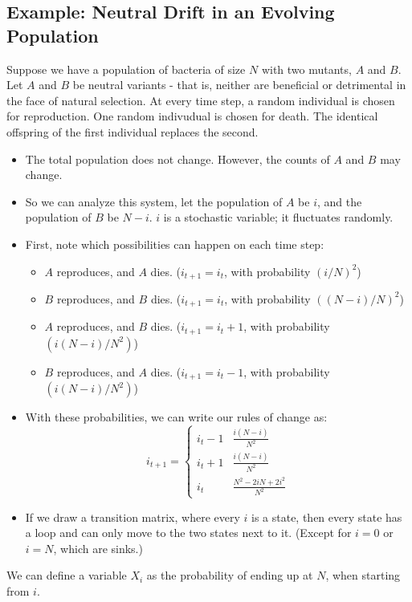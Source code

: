\documentclass[10pt]{article}
\begin{document}
\subsection*{Example: Neutral Drift in an Evolving Population}
Suppose we have a population of bacteria of size $N$ with two mutants, $A$ and $B$.  Let $A$ and $B$ be neutral variants - that is, neither are beneficial or detrimental in the face of natural selection.  At every time step, a random individual is chosen for reproduction.  One random indivudual is chosen for death.  The identical offspring of the first individual replaces the second.
\begin{itemize}
	\item The total population does not change.  However, the counts of $A$ and $B$ may change.
	\item So we can analyze this system, let the population of $A$ be $i$, and the population of $B$ be $N - i$.  $i$ is a stochastic variable; it fluctuates randomly.
	\item First, note which possibilities can happen on each time step:
	\begin{itemize}
	    \item $A$ reproduces, and $A$ dies.  ($i_{t + 1} = i_t$, with probability $(i / N)^2$)  
	    \item $B$ reproduces, and $B$ dies.  ($i_{t + 1} = i_t$, with probability $((N - i) / N)^2$)
	    \item $A$ reproduces, and $B$ dies.  ($i_{t + 1} = i_t + 1$, with probability $(i(N - i) / N^2)$)
	    \item $B$ reproduces, and $A$ dies.  ($i_{t + 1} = i_t - 1$, with probability $(i(N - i) / N^2)$)
    \end{itemize}
    \item With these probabilities, we can write our rules of change as:
	    \[i_{t + 1} = \begin{cases}
            i_t - 1 & \frac{i (N - i)}{N^2} \\
            i_t + 1 & \frac{i (N - i)}{N^2} \\
            i_t & \frac{N^2 - 2iN + 2i^2}{N^2}
        \end{cases}\]
    \item If we draw a transition matrix, where every $i$ is a state, then every state has a loop and can only move to the two states next to it.  (Except for $i = 0$ or $i = N$, which are sinks.)
\end{itemize}
We can define a variable $X_i$ as the probability of ending up at $N$, when starting from $i$.
\end{document}

